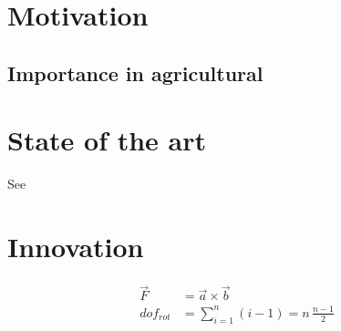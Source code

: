 

\lipsum[1]


\section{Motivation} %
\label{sec:motivation}

\lipsum[5-6]

\subsection{Importance in agricultural}
\lipsum[7]


\section{State of the art} %
\label{sec:state_of_the_art}

\lipsum[47]

See \cite{KJ:2016}




\section{Innovation} %
\label{sec:innovation}

\lipsum[2]

\begin{align}
  \vec F &= \vec a \times \vec b\\
  {dof}_{rot} &= \sum_{i=1}^n (i-1) = n\, \frac{n-1}{2}
\end{align}

\lipsum[7-20]

